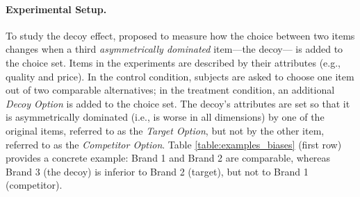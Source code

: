 
\paragraph{Experimental Setup.}
To study the decoy effect, \citet{huber1982adding} proposed to measure 
how the choice between two items changes when a third \emph{asymmetrically dominated} item---the decoy--- is added to the choice set.
Items in the experiments are described by their attributes (e.g., quality and price).
In the control condition, subjects are asked to choose one item out of two comparable alternatives;
in the treatment condition, an additional \textit{Decoy Option} is added to the choice set.
The decoy's attributes are set so that it is asymmetrically dominated
(i.e., is worse in all dimensions) by one of the original items, referred to as the \textit{Target Option}, but not by the other item, referred to as the \textit{Competitor Option}.
Table \ref{table:examples_biases} (first row) provides a concrete example:
Brand 1 and Brand 2 are comparable, whereas Brand 3 (the decoy) is inferior to Brand 2 (target), but not to Brand 1 (competitor).

